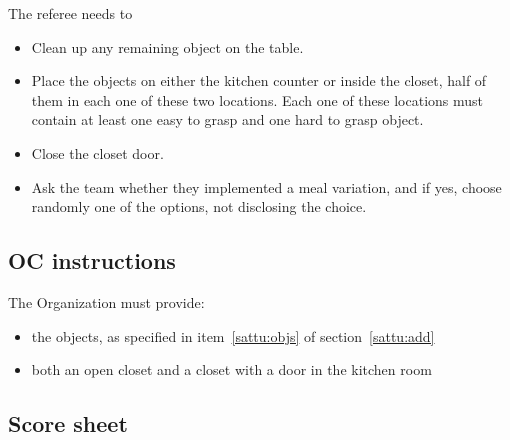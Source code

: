 The referee needs to
\begin{itemize}
\item Clean up any remaining object on the table.
\item Place the objects on either the kitchen counter or inside the closet, half of them in each one of these two locations. Each one of these locations must contain at least one easy to grasp and one hard to grasp object.
\item Close the closet door.
\item Ask the team whether they implemented a meal variation, and if yes, choose randomly one of the options, not disclosing the choice.
\end{itemize}

\subsection{OC instructions}

The Organization must provide:
\begin{itemize}
\item the objects, as specified in item~\ref{sattu:objs} of section~\ref{sattu:add}
\item both an open closet and a closet with a door in the kitchen room
\end{itemize}


\subsection{Score sheet}


